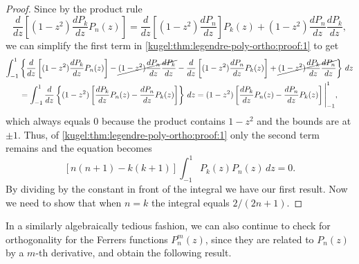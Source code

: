\begin{proof}
  Since by the product rule
  \begin{equation*}
    \frac{d}{dz} \left[ (1 - z^2) \frac{dP_k}{dz} P_n(z) \right]
    =
    \frac{d}{dz} \left[ (1 - z^2) \frac{dP_n}{dz} \right] P_k(z)
      + (1 - z^2) \frac{dP_n}{dz} \frac{dP_k}{dz},
  \end{equation*}
  we can simplify the first term in
  \eqref{kugel:thm:legendre-poly-ortho:proof:1} to get
  \begin{gather*}
    \int_{-1}^1 \left\{
      \frac{d}{dz} \left[ (1 - z^2) \frac{dP_k}{dz} P_n(z) \right]
        - \cancel{(1 - z^2) \frac{dP_n}{dz} \frac{dP_k}{dz}}
        - \frac{d}{dz} \left[ (1 - z^2) \frac{dP_n}{dz} P_k(z) \right]
        + \cancel{(1 - z^2) \frac{dP_k}{dz} \frac{dP_n}{dz}}
    \right\} \, dz \\
    = \int_{-1}^1 \frac{d}{dz} \left\{ (1 - z^2) \left[
      \frac{dP_k}{dz} P_n(z) - \frac{dP_n}{dz} P_k(z)
    \right] \right\} \, dz
    = (1 - z^2) \left[
      \frac{dP_k}{dz} P_n(z) - \frac{dP_n}{dz} P_k(z)
    \right] \Bigg|_{-1}^1,
  \end{gather*}
  which always equals 0 because the product contains $1 - z^2$ and the bounds
  are at $\pm 1$. Thus, of \eqref{kugel:thm:legendre-poly-ortho:proof:1} only
  the second term remains and the equation becomes
  \begin{equation*}
    \left[ n(n+1) - k(k+1) \right] \int_{-1}^1 P_k(z) P_n(z) \, dz = 0.
  \end{equation*}
  By dividing by the constant in front of the integral we have our first result.
  Now we need to show that when $n = k$ the integral equals $2 / (2n + 1)$.
\end{proof}

In a similarly algebraically tedious fashion, we can also continue to check for
orthogonality for the Ferrers functions $P^m_n(z)$, since they are related to
$P_n(z)$ by a $m$-th derivative, and obtain the following result.

